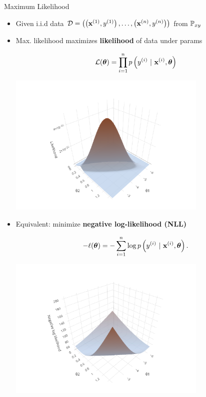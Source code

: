 \documentclass[11pt,compress,t,notes=noshow, xcolor=table]{beamer}
\begin{document}
\begin{vbframe}{Maximum Likelihood}
\begin{itemize}
\end{itemize}


\framebreak 

\begin{itemize}
\item Given i.i.d data $\mathcal{D} = \left( \left(\mathbf{x}^{(1)}, y^{(1)}\right), \ldots, \left(\mathbf{x}^{(n)}, y^{(n)}\right)\right)$ from $\mathbb{P}_{xy}$ 
\item Max. likelihood maximizes \textbf{likelihood} of data under params

\begin{minipage}{0.5\textwidth}
$$ \mathcal{L}(\bm{\theta}) = \prod_{i=1}^n p\left(y^{(i)} ~|~\mathbf{x}^{(i)}, \bm{\theta}\right) $$
\end{minipage}%
\begin{minipage}{0.5\textwidth}
\includegraphics[width = 0.75\textwidth]{figure/log_reg_ml.pdf}
\end{minipage}

\item Equivalent: minimize \textbf{negative log-likelihood (NLL)}

\begin{minipage}{0.5\textwidth}
$$ -\ell(\bm{\theta}) = -\sum\limits_{i=1}^n \log p\left(y^{(i)} ~|~\mathbf{x}^{(i)}, \bm{\theta}\right). $$
\end{minipage}%
\begin{minipage}{0.5\textwidth}
\includegraphics[width = 0.75\textwidth]{figure/log_reg_erm.pdf}
\end{minipage}
\end{itemize}

\end{vbframe}
\end{document}
